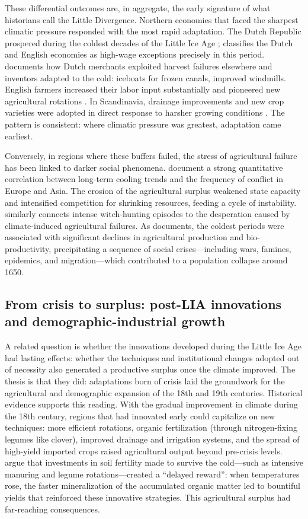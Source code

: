 \documentclass[11pt,a4paper]{article}
\begin{document}
These differential outcomes are, in aggregate, the early signature of what historians call the Little Divergence. Northern economies that faced the sharpest climatic pressure responded with the most rapid adaptation. The Dutch Republic prospered during the coldest decades of the Little Ice Age \parencite{Pfister2022}; \textcite{Allen2003} classifies the Dutch and English economies as high-wage exceptions precisely in this period. \textcite{Degroot2018} documents how Dutch merchants exploited harvest failures elsewhere and inventors adapted to the cold: iceboats for frozen canals, improved windmills. English farmers increased their labor input substantially and pioneered new agricultural rotations \parencite{AllenWeisdorf2011}. In Scandinavia, drainage improvements and new crop varieties were adopted in direct response to harsher growing conditions \parencite{Skoglund2023}. The pattern is consistent: where climatic pressure was greatest, adaptation came earliest.

Conversely, in regions where these buffers failed, the stress of agricultural failure has been linked to darker social phenomena. \textcite{Iyigun2017} document a strong quantitative correlation between long-term cooling trends and the frequency of conflict in Europe and Asia. The erosion of the agricultural surplus weakened state capacity and intensified competition for shrinking resources, feeding a cycle of instability. \textcite{Behringer1999} similarly connects intense witch-hunting episodes to the desperation caused by climate-induced agricultural failures. As \textcite{Zhang2011} documents, the coldest periods were associated with significant declines in agricultural production and bio-productivity, precipitating a sequence of social crises---including wars, famines, epidemics, and migration---which contributed to a population collapse around 1650.
\subsection*{From crisis to surplus: post-LIA innovations and demographic-industrial growth}
A related question is whether the innovations developed during the Little Ice Age had lasting effects: whether the techniques and institutional changes adopted out of necessity also generated a productive surplus once the climate improved. The thesis is that they did: adaptations born of crisis laid the groundwork for the agricultural and demographic expansion of the 18th and 19th centuries.
Historical evidence supports this reading. With the gradual improvement in climate during the 18th century, regions that had innovated early could capitalize on new techniques: more efficient rotations, organic fertilization (through nitrogen-fixing legumes like clover), improved drainage and irrigation systems, and the spread of high-yield imported crops raised agricultural output beyond pre-crisis levels. \textcite{Tello2017} argue that investments in soil fertility made to survive the cold---such as intensive manuring and legume rotations---created a ``delayed reward'': when temperatures rose, the faster mineralization of the accumulated organic matter led to bountiful yields that reinforced these innovative strategies. This agricultural surplus had far-reaching consequences.
\end{document}
